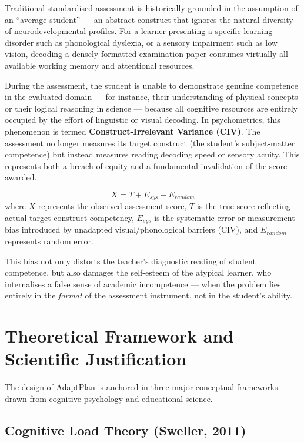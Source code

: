 \documentclass[12pt,a4paper]{report}
\begin{document}
Traditional standardised assessment is historically grounded in the assumption of an ``average student'' — an abstract construct that ignores the natural diversity of neurodevelopmental profiles. For a learner presenting a specific learning disorder such as phonological dyslexia, or a sensory impairment such as low vision, decoding a densely formatted examination paper consumes virtually all available working memory and attentional resources.

During the assessment, the student is unable to demonstrate genuine competence in the evaluated domain — for instance, their understanding of physical concepts or their logical reasoning in science — because all cognitive resources are entirely occupied by the effort of linguistic or visual decoding. In psychometrics, this phenomenon is termed \textbf{Construct-Irrelevant Variance (CIV)}. The assessment no longer measures its target construct (the student's subject-matter competence) but instead measures reading decoding speed or sensory acuity. This represents both a breach of equity and a fundamental invalidation of the score awarded.

\begin{equation}
  X = T + E_{sys} + E_{random}
  \label{eq:classical_test_theory}
\end{equation}
where $X$ represents the observed assessment score, $T$ is the true score reflecting actual target construct competency, $E_{sys}$ is the systematic error or measurement bias introduced by unadapted visual/phonological barriers (CIV), and $E_{random}$ represents random error.

This bias not only distorts the teacher's diagnostic reading of student competence, but also damages the self-esteem of the atypical learner, who internalises a false sense of academic incompetence — when the problem lies entirely in the \textit{format} of the assessment instrument, not in the student's ability.

\section{Theoretical Framework and Scientific Justification}

The design of AdaptPlan is anchored in three major conceptual frameworks drawn from cognitive psychology and educational science.

\subsection{Cognitive Load Theory (Sweller, 2011)}
\end{document}
